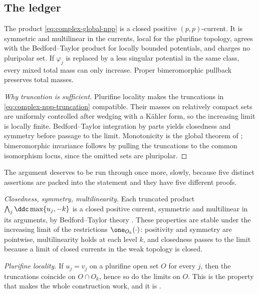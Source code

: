 \subsection{The ledger}
\label{sec:ch51-npp-ledger}

\begin{theorem}\label{thm:complex-npp-ledger}
The product \eqref{eq:complex-global-npp} is a closed positive
\((p,p)\)-current.  It is symmetric and multilinear in the currents,
local for the plurifine topology, agrees with the Bedford--Taylor
product for locally bounded potentials, and charges no pluripolar set.
If \(\varphi_j\) is replaced by a less singular potential in the same
class, every mixed total mass can only increase.  Proper bimeromorphic
pullback preserves total masses.
\end{theorem}

\begin{proof}[Why truncation is sufficient]
Plurifine locality makes the truncations in
\eqref{eq:complex-npp-truncation} compatible.  Their masses on relatively
compact sets are uniformly controlled after wedging with a K\"ahler
form, so the increasing limit is locally finite.  Bedford--Taylor
integration by parts yields closedness and symmetry before passage to
the limit.  Monotonicity is the global theorem of
\cite{BEGZ10}; bimeromorphic invariance follows by pulling the
truncations to the common isomorphism locus, since the omitted sets are
pluripolar.
\end{proof}

The argument deserves to be run through once more, slowly, because five
distinct assertions are packed into the statement and they have five
different proofs.

\emph{Closedness, symmetry, multilinearity.}  Each truncated product
\(\bigwedge_j\ddc\max\{u_j,-k\}\) is a closed positive current, symmetric
and multilinear in its arguments, by Bedford--Taylor theory
\cite{BT76,BT82}.  These properties are stable under the increasing limit
of the restrictions \(\one_{O_k}(\cdot)\): positivity and symmetry are
pointwise, multilinearity holds at each level \(k\), and closedness
passes to the limit because a limit of closed currents in the weak
topology is closed.

\emph{Plurifine locality.}  If \(u_j=v_j\) on a plurifine open set \(O\)
for every \(j\), then the truncations coincide on
\(O\cap O_k\), hence so do the limits on \(O\).  This is the property that
makes the whole construction work, and it is
\cite{BT87}.

